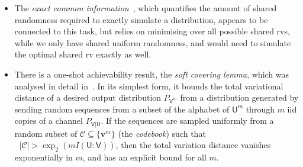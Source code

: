 \documentclass[10pt, a4paper]{article}
\numberwithin{equation}{section} %
\theoremstyle{definition}
\theoremstyle{plain}
\newcommand{\abs}[1]{\mathop{}\left\lvert#1\right\rvert}
\newcommand{\?}{\mathrel{?}} %
\newcommand{\cvec}[1]{\boldsymbol{\mathbf{#1}}}    %
\newcommand{\crv}[1]{\mathsf{#1}}
\begin{document}
    \begin{itemize}
      \item The \emph{exact common information}~\cite{ExactCommonInfo}, which quantifies the amount of shared randomness required to exactly simulate a distribution, appears to be connected to this task, but relies on minimising over all possible shared rvs, while we only have shared uniform randomness, and would need to simulate the optimal shared rv exactly as well.
      \item There is a one-shot achievability result, the \emph{soft covering lemma}, which was analysed in detail in~\cite[Lem. IV.1]{DistrChanSynth}. In its simplest form, it bounds the total variational distance of a desired output distribution \(P_{\crv{V}^m}\) from a distribution generated by sending random sequences from a subset of the alphabet of \(\crv{U}^{m}\) through \(m\) iid copies of a channel \(P_{\crv{V}|\crv{U}}\). If the sequences are sampled uniformly from a random subset of \(\mathcal{C} \subseteq \{\cvec{v}^m\}\) (the \emph{codebook}) such that \(\abs{\mathcal{C}} > \exp_2(mI(\crv{U}:\crv{V}))\), then the total variation distance vanishes exponentially in \(m\), and has an explicit bound for all \(m\).


\end{itemize}
\end{document}

